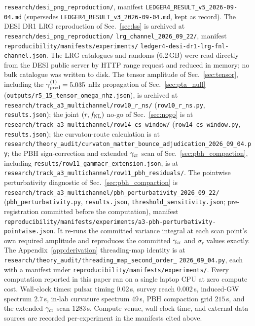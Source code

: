 \documentclass[aps,prd,twocolumn,superscriptaddress,nofootinbib,longbibliography]{revtex4-2}
\newcommand{\fnl}{f_{\rm NL}}
\begin{document}
\texttt{research/desi\_png\_reproduction/}, manifest
\texttt{LEDGER4\_RESULT\_v5\_2026-09-04.md} (supersedes
\texttt{LEDGER4\_RESULT\_v3\_2026-09-04.md}, kept as record). The DESI
DR1 LRG reproduction of Sec.~\ref{sec:lss} is archived at
\texttt{research/desi\_png\_reproduction/}\allowbreak
\texttt{lrg\_channel\_2026\_09\_22/}, manifest
\texttt{reproducibility/manifests/}\allowbreak\texttt{experiments/}\allowbreak
\texttt{ledger4-desi-dr1-lrg-fnl-channel.json}. The LRG catalogues and
randoms ($6.2\,$GB) were read directly from the DESI public server by
HTTP range request and reduced in memory; no bulk catalogue was written
to disk. The tensor amplitude of
Sec.~\ref{sec:tensor}, including the $\gamma_{\rm
pred}^{(1)}=5.035$ nHz propagation of Sec.~\ref{sec:pta_null}
(\texttt{outputs/r5\_15\_tensor\_omega\_nhz.json}), is archived at
\texttt{research/track\_a3\_multichannel/}\allowbreak\texttt{row10\_r\_ns/}
(\texttt{row10\_r\_ns.py},
\texttt{results.json}); the joint $(r,\fnl)$ no-go of Sec.~\ref{sec:nogo}
is at
\texttt{research/track\_a3\_multichannel/}\allowbreak\texttt{row14\_cs\_window/}
(\texttt{row14\_cs\_window.py}, \texttt{results.json}); the curvaton-route
calculation is at
\texttt{research/theory\_audit/}\allowbreak\texttt{curvaton\_matter\_bounce\_}\allowbreak\texttt{adjudication\_2026\_09\_04.py};
the PBH sign-correction and extended
$\gamma_{\rm cr}$ scan of Sec.~\ref{sec:pbh_compaction},
including \texttt{results/}\allowbreak\texttt{row11\_gammacr\_extension.json}, is at
\texttt{research/track\_a3\_multichannel/}\allowbreak\texttt{row11\_pbh\_residuals/}.
The pointwise perturbativity diagnostic of Sec.~\ref{sec:pbh_compaction} is
\texttt{research/track\_a3\_multichannel/}\allowbreak\texttt{pbh\_perturbativity\_2026\_09\_22/}
(\texttt{pbh\_perturbativity.py}, \texttt{results.json},
\texttt{threshold\_sensitivity.json}; pre-registration committed before the computation), manifest
\texttt{reproducibility/manifests/}\allowbreak\texttt{experiments/}\allowbreak\texttt{a3-pbh-perturbativity-pointwise.json}.
It re-runs the committed variance integral at each scan point's own required amplitude and reproduces
the committed $\gamma_{\rm cr}$ and $\sigma_r$ values exactly.
The
Appendix~\ref{app:derivation} threading-map identity is at
\texttt{research/theory\_audit/threading\_map\_second\_order\_}\allowbreak
\texttt{2026\_09\_04.py}, each with a manifest under
\texttt{reproducibility/manifests/experiments/}.
Every computation reported in
this paper ran on a single laptop CPU at zero compute
cost. Wall-clock times: pulsar timing $0.02\,$s, survey reach $0.002\,$s,
induced-GW spectrum $2.7\,$s, in-lab curvature spectrum $49\,$s, PBH
compaction grid $215\,$s, and the extended $\gamma_{\rm cr}$ scan
$1283\,$s. Compute venue,
wall-clock time, and external data sources are recorded per-experiment in the
manifests cited above.
\end{document}
